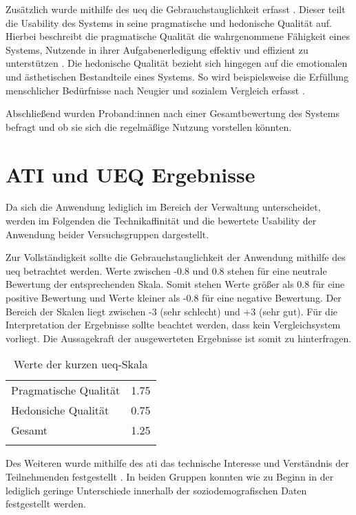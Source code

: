 Zusätzlich wurde mithilfe des \ac{ueq} die Gebrauchstauglichkeit erfasst
\cite{burghardt_mensch_2018}. Dieser teilt die Usability des Systems in seine pragmatische und
hedonische Qualität auf. Hierbei beschreibt die pragmatische Qualität die wahrgenommene Fähigkeit
eines Systems, Nutzende in ihrer Aufgabenerledigung effektiv und effizient zu unterstützen
\cite{hassenzahl_thing_2004}. Die hedonische Qualität bezieht sich hingegen auf die emotionalen und
ästhetischen Bestandteile eines Systems. So wird beispielsweise die Erfüllung menschlicher
Bedürfnisse nach Neugier und sozialem Vergleich erfasst \cite{hassenzahl_thing_2004}.

Abschließend wurden Proband:innen nach einer Gesamtbewertung des Systems befragt und ob sie sich die
regelmäßige Nutzung vorstellen könnten.



\section{ATI und UEQ Ergebnisse}
\label{sec:prese}
Da sich die Anwendung lediglich im Bereich der Verwaltung unterscheidet, werden im
Folgenden die Technikaffinität und die bewertete Usability der Anwendung beider
Versuchsgruppen dargestellt.

Zur Vollständigkeit sollte die Gebrauchstauglichkeit der Anwendung mithilfe des \ac{ueq} betrachtet
werden. Werte zwischen -0.8 und 0.8 stehen für eine neutrale Bewertung der entsprechenden Skala.
Somit stehen Werte größer als 0.8 für eine positive Bewertung und Werte kleiner als -0.8 für eine
negative Bewertung. Der Bereich der Skalen liegt zwischen -3 (sehr schlecht) und +3 (sehr gut). Für
die Interpretation der Ergebnisse sollte beachtet werden, dass kein Vergleichsystem vorliegt. Die
Aussagekraft der ausgewerteten Ergebnisse ist somit zu hinterfragen.
\begin{table}[h]
  \centering
  \caption{Werte der kurzen \ac{ueq}-Skala}
  \begin{tabular}{lc}
    \arrayrulecolor{maincolor}\hline
    Pragmatische Qualität & 1.75 \\
    Hedonsiche Qualität   & 0.75 \\
    Gesamt                & 1.25 \\
    \arrayrulecolor{maincolor}\hline
  \end{tabular}
  \label{table:ueq}
\end{table}

Des Weiteren wurde mithilfe des \ac{ati} das technische Interesse und Verständnis der Teilnehmenden
festgestellt \cite{attig_assessing_2017}. In beiden Gruppen konnten wie zu Beginn in der
 lediglich geringe Unterschiede innerhalb der soziodemografischen Daten
festgestellt werden.


